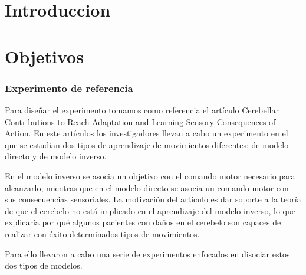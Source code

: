 \documentclass[a4paper,11pt, oneside]{book}
\begin{document}


%

%
%
%
%
%
%
%
%
%
%
%
%
%
%
%
%
%
%
%
%
%
%
\tableofcontents

\chapter{Introduccion}


\chapter{Objetivos}
\subsection{Experimento de referencia}
Para diseñar el experimento tomamos como referencia el artículo Cerebellar Contributions to Reach Adaptation and Learning Sensory Consequences of Action. En este artículos los investigadores llevan a cabo un experimento en el que se estudian dos tipos de aprendizaje de movimientos diferentes:  de modelo directo y de modelo inverso.

En el modelo inverso se asocia un objetivo con el comando motor necesario para alcanzarlo, mientras que en el modelo directo se asocia un comando motor con sus consecuencias sensoriales. La motivación del artículo es dar soporte a la teoría de que el cerebelo no está implicado en el aprendizaje del modelo inverso, lo que explicaría por qué algunos pacientes con daños en el cerebelo son capaces de realizar con éxito determinados tipos de movimientos.

Para ello llevaron a cabo una serie de experimentos enfocados en disociar estos dos tipos de modelos. 
\end{document}

